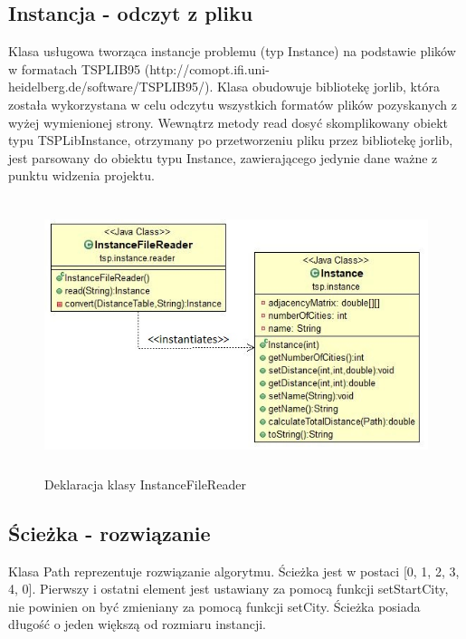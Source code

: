 \documentclass[a4paper,11pt]{article}
\begin{document}
\subsection{Instancja - odczyt z pliku}

Klasa usługowa tworząca instancje problemu (typ Instance) na podstawie plików w formatach TSPLIB95 (http://comopt.ifi.uni-heidelberg.de/software/TSPLIB95/). Klasa obudowuje bibliotekę jorlib, która została wykorzystana w celu odczytu wszystkich formatów plików pozyskanych z wyżej wymienionej strony. Wewnątrz metody read dosyć skomplikowany obiekt typu TSPLibInstance, otrzymany po przetworzeniu pliku przez bibliotekę jorlib, jest parsowany do obiektu typu Instance, zawierającego jedynie dane ważne z punktu widzenia projektu.

\begin{figure}[H]
\centering
\includegraphics[height=8cm]{ClassInstanceFileReader.JPG}
\caption{Deklaracja klasy InstanceFileReader}
\end{figure}

\subsection{Ścieżka - rozwiązanie}

Klasa Path reprezentuje rozwiązanie algorytmu. Ścieżka jest w postaci [0, 1, 2, 3, 4, 0]. Pierwszy i ostatni element jest ustawiany za pomocą funkcji setStartCity, nie powinien on być zmieniany za pomocą funkcji setCity. Ścieżka posiada długość o jeden większą od rozmiaru instancji. 
\end{document}
